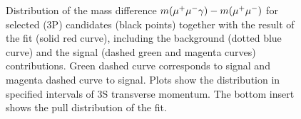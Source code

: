 \begin{figure}[H]
\begin{picture}
  \end{picture}
  \caption {\small
    Distribution of the mass difference $m(\mumu\gamma) - m(\mumu)$ for selected
    \chib(3P) candidates (black points) together with the result of the fit
    (solid red curve), including the background (dotted blue curve) and the
    signal (dashed green and magenta curves) contributions. Green dashed curve
    corresponds to \chibone signal and magenta dashed curve to \chibtwo signal.
    Plots show the distribution in specified intervals of \Y3S transverse
    momentum. The bottom insert shows the  pull distribution of the fit.}
  \label{fig:chib-3s:fits}
\end{figure}

